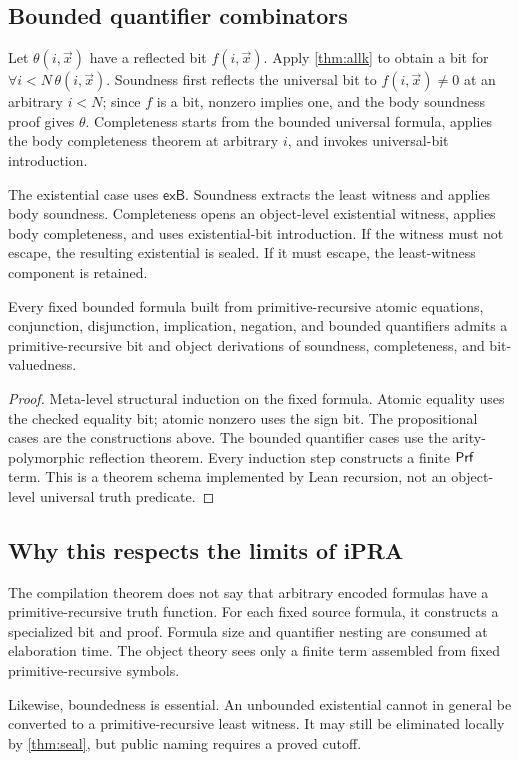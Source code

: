 \subsection{Bounded quantifier combinators}

Let \(\theta(i,\vec x)\) have a reflected bit \(f(i,\vec x)\).  Apply
\cref{thm:allk} to obtain a bit for
\(\forall i<N\,\theta(i,\vec x)\).  Soundness first reflects the universal bit to
\(f(i,\vec x)\ne0\) at an arbitrary \(i<N\); since \(f\) is a bit, nonzero implies one, and the body
soundness proof gives \(\theta\).  Completeness starts from the bounded universal formula, applies
the body completeness theorem at arbitrary \(i\), and invokes universal-bit introduction.

The existential case uses \(\mathsf{exB}\).  Soundness extracts the least witness and applies body
soundness.  Completeness opens an object-level existential witness, applies body completeness, and
uses existential-bit introduction.  If the witness must not escape, the resulting existential is
sealed.  If it must escape, the least-witness component is retained.

\begin{theorem}\label{thm:bounded-compile}
Every fixed bounded formula built from primitive-recursive atomic equations, conjunction,
disjunction, implication, negation, and bounded quantifiers admits a primitive-recursive bit and
object derivations of soundness, completeness, and bit-valuedness.
\end{theorem}

\begin{proof}
Meta-level structural induction on the fixed formula.  Atomic equality uses the checked equality bit;
atomic nonzero uses the sign bit.  The propositional cases are the constructions above.  The bounded
quantifier cases use the arity-polymorphic reflection theorem.  Every induction step constructs a
finite \(\mathsf{Prf}\) term.  This is a theorem schema implemented by Lean recursion, not an object-level
universal truth predicate.
\end{proof}

\subsection{Why this respects the limits of iPRA}

The compilation theorem does not say that arbitrary encoded formulas have a primitive-recursive
truth function.  For each fixed source formula, it constructs a specialized bit and proof.  Formula
size and quantifier nesting are consumed at elaboration time.  The object theory sees only a finite
term assembled from fixed primitive-recursive symbols.

Likewise, boundedness is essential.  An unbounded existential cannot in general be converted to a
primitive-recursive least witness.  It may still be eliminated locally by \cref{thm:seal}, but public
naming requires a proved cutoff.
